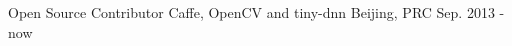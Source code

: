 \begin{cventries}
\cventry
{Open Source Contributor} %
{Caffe, OpenCV and tiny-dnn} %
{Beijing, PRC} %
{Sep. 2013 - now} %
{ %
}


\end{cventries}
